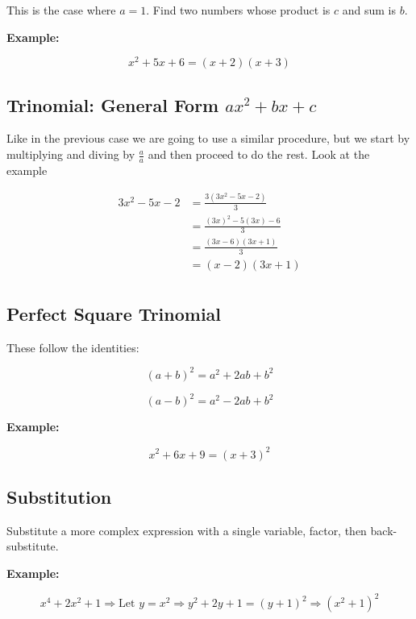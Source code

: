 This is the case where \(a = 1\). Find two numbers whose product is \(c\) and sum is \(b\).
\vspace{\baselineskip}

\textbf{Example:}

\[
  x^2 + 5x + 6 = (x + 2)(x + 3)
\]

\subsection{Trinomial: General Form \texorpdfstring{\(ax^2 + bx + c\)}{ax² + bx + c}}

Like in the previous case we are going to use a similar procedure, but we start by
multiplying and diving by \(\frac{a}{a}\) and then proceed to do the rest. Look at the example

\begin{align*}
3x^2 -5x - 2 &= \frac{3(3x^2 -5x - 2)}{3} \\
             &= \frac{{(3x)}^2 -5(3x) - 6}{3}\\ 
             &= \frac{(3x- 6)(3x+1)}{3} \\
             &= (x- 2)(3x +1) \\
\end{align*}


\subsection{Perfect Square Trinomial}

These follow the identities:

\[
  {(a + b)}^2 = a^2 + 2ab + b^2
\]

\[
  {(a - b)}^2 = a^2 - 2ab + b^2
\]

\textbf{Example:}
\vspace{\baselineskip}

\[
  x^2 + 6x + 9 = {(x + 3)}^2
\]

\subsection{Substitution}

Substitute a more complex expression with a single variable, factor, then back-substitute.
\vspace{\baselineskip}

\textbf{Example:}

\[
  x^4 + 2x^2 + 1 \Rightarrow \text{Let } y = x^2 \Rightarrow y^2 + 2y + 1 = {(y + 1)}^2 
  \Rightarrow {(x^2 + 1)}^2
\]

